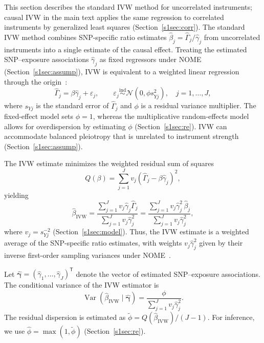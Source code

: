\noindent This section describes the standard IVW method for uncorrelated instruments; causal IVW in the main text applies the same regression to correlated instruments by generalized least squares (Section~\ref{s1sec:corr}). The standard IVW method combines SNP-specific ratio estimates $\hat{\beta}_j=\hat{\Gamma}_j/\hat{\gamma}_j$ from uncorrelated instruments into a single estimate of the causal effect. Treating the estimated SNP--exposure associations $\hat{\gamma}_j$ as fixed regressors under NOME (Section~\ref{s1sec:assump}), IVW is equivalent to a weighted linear regression through the origin~\cite{burgess2017interpreting,dudbridge2025grip}:
\begin{equation*}
\hat{\Gamma}_j = \beta\hat{\gamma}_j + \varepsilon_j,
\qquad
\varepsilon_j \stackrel{\mathrm{ind}}{\sim}
\mathcal{N}(0,\phi s_{Yj}^{2}),
\quad j=1,\ldots,J,
\end{equation*}
where $s_{Yj}$ is the standard error of $\hat{\Gamma}_j$ and $\phi$ is a residual variance multiplier. The fixed-effect model sets $\phi=1$, whereas the multiplicative random-effects model allows for overdispersion by estimating $\phi$ (Section~\ref{s1sec:re}). IVW can accommodate balanced pleiotropy that is unrelated to instrument strength (Section~\ref{s1sec:assump}).

\noindent The IVW estimate minimizes the weighted residual sum of squares
\begin{equation*}
Q(\beta)
=
\sum_{j=1}^{J}
v_j(\hat{\Gamma}_j-\beta\hat{\gamma}_j)^2,
\end{equation*}
yielding
\begin{equation*}
\hat{\beta}_{\text{IVW}}
=
\frac{\sum_{j=1}^{J}v_j\hat{\gamma}_j\hat{\Gamma}_j}
     {\sum_{j=1}^{J}v_j\hat{\gamma}_j^2}
=
\frac{\sum_{j=1}^{J}v_j\hat{\gamma}_j^2\,\hat{\beta}_j}
     {\sum_{j=1}^{J}v_j\hat{\gamma}_j^2},
\end{equation*}
where $v_j=s_{Yj}^{-2}$ (Section~\ref{s1sec:model}). Thus, the IVW estimate is a weighted average of the SNP-specific ratio estimates, with weights $v_j\hat{\gamma}_j^2$ given by their inverse first-order sampling variances under NOME~\cite{burgess2017interpreting}.

\noindent Let $\hat{\boldsymbol{\gamma}}=(\hat{\gamma}_1,\ldots,\hat{\gamma}_J)^{\mathsf T}$ denote the vector of estimated SNP--exposure associations. The conditional variance of the IVW estimator is
\begin{equation*}
\operatorname{Var}(\hat{\beta}_{\text{IVW}}\mid\hat{\boldsymbol{\gamma}})
=
\frac{\phi}{\sum_{j=1}^{J}v_j\hat{\gamma}_j^2}.
\end{equation*}
The residual dispersion is estimated as $\widetilde{\phi}=Q(\hat{\beta}_{\text{IVW}})/(J-1)$. For inference, we use $\hat{\phi}=\max(1,\widetilde{\phi})$ (Section~\ref{s1sec:re}).

